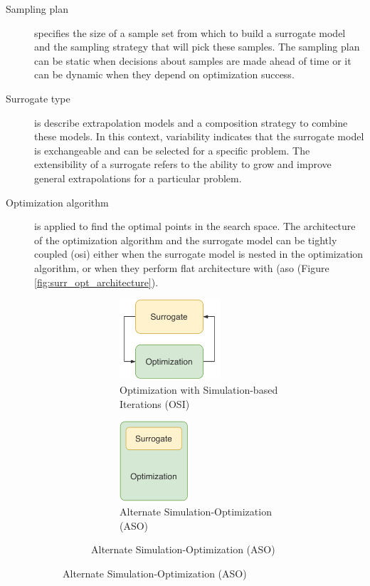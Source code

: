        \begin{description}
            \item[Sampling plan] specifies the size of a sample set from which to build a surrogate model and the sampling strategy that will pick these samples. The sampling plan can be static when decisions about samples are made ahead of time or it can be dynamic when they depend on optimization success.
            \item[Surrogate type] is describe extrapolation models and a composition strategy to combine these models. In this context, variability indicates that the surrogate model is exchangeable and can be selected for a specific problem. The extensibility of a surrogate refers to the ability to grow and improve general extrapolations for a particular problem.
            \item[Optimization algorithm] is applied to find the optimal points in the search space. The architecture of the optimization algorithm and the surrogate model can be tightly coupled (\gls{osi}) either when the surrogate model is nested in the optimization algorithm, or when they perform flat architecture with (\gls{aso} (Figure \ref{fig:surr_opt_architecture}).
            
                \begin{figure}[h]
                    \centering
                    \begin{subfigure}{\textwidth}
                        \centering
                        \begin{subfigure}{0.45\textwidth}
                            \centering
                            \includegraphics[height=3cm]{content/images/utility/architecture_aso}
                            \caption{Optimization with Simulation-based Iterations (OSI)}
                            \label{fig:surr_opt_architecture_aso}
                        \end{subfigure} 
                        \begin{subfigure}{0.45\textwidth}
                            \centering
                            \includegraphics[height=3cm]{content/images/utility/architecture_iso}
                            \caption{Alternate Simulation-Optimization (ASO)}
                            \label{fig:surr_opt_architecture_iso}
                        \end{subfigure} 
                    \end{subfigure} 


\end{figure}
\end{description}
